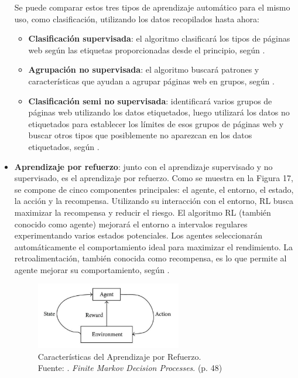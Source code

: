 \begin{itemize}
	Se puede comparar estos tres tipos de aprendizaje automático para el mismo uso, como clasificación, utilizando los datos recopilados hasta ahora:

	\begin{itemize}
		\item \textbf{Clasificación supervisada}: el algoritmo clasificará los tipos de páginas web según las etiquetas proporcionadas desde el principio, según \parencite{bk_zambrano2018supnosup}.
		\item \textbf{Agrupación no supervisada}: el algoritmo buscará patrones y características que ayudan a agrupar páginas web en grupos, según \parencite{bk_zambrano2018supnosup}.
		\item \textbf{Clasificación semi no supervisada}: identificará varios grupos de páginas web utilizando los datos etiquetados, luego utilizará los datos no etiquetados para establecer los límites de esos grupos de páginas web y buscar otros tipos que posiblemente no aparezcan en los datos etiquetados, según \parencite{bk_zambrano2018supnosup}.
	\end{itemize}
	

	\item \textbf{Aprendizaje por refuerzo}: junto con el aprendizaje supervisado y no supervisado, es el aprendizaje por refuerzo. Como se muestra en la Figura 17, se compone de cinco componentes principales: el agente, el entorno, el estado, la acción y la recompensa. Utilizando su interacción con el entorno, RL busca maximizar la recompensa y reducir el riesgo. El algoritmo RL (también conocido como agente) mejorará el entorno a intervalos regulares experimentando varios estados potenciales. Los agentes seleccionarán automáticamente el comportamiento ideal para maximizar el rendimiento. La retroalimentación, también conocida como recompensa, es lo que permite al agente mejorar su comportamiento, según \parencite{bk_sutton2018rl}.
	
	\begin{figure}[h]
		\begin{center}
			\includegraphics[width=0.60\textwidth]{2/figures/aprendizaje_refuerzo.jpg}
			\caption[Características del Aprendizaje por Refuerzo]{Características del Aprendizaje por Refuerzo.\\
				Fuente: \cite{bk_sutton2018rl}. \textit{Finite Markov Decision Processes}. (p. 48)}
			\label{2:fig4}
		\end{center}
	\end{figure}
	
\end{itemize}

